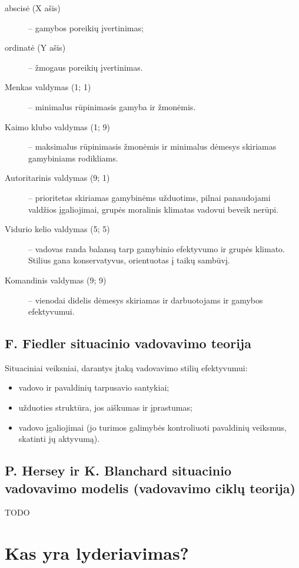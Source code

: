 \begin{description}
  \item[abscisė (X ašis)] – gamybos poreikių įvertinimas;
  \item[ordinatė (Y ašis)] – žmogaus poreikių įvertinimas.
\end{description}

\begin{description}
  \item[Menkas valdymas (1; 1)] – minimalus rūpinimasis gamyba ir žmonėmis.
  \item[Kaimo klubo valdymas (1; 9)] – maksimalus rūpinimasis žmonėmis
    ir minimalus dėmesys skiriamas gamybiniams rodikliams.
  \item[Autoritarinis valdymas (9; 1)] – prioritetas skiriamas gamybinėms
    užduotims, pilnai panaudojami valdžios įgaliojimai, grupės moralinis
    klimatas vadovui beveik nerūpi.
  \item[Vidurio kelio valdymas (5; 5)] – vadovas randa balansą tarp
    gamybinio efektyvumo ir grupės klimato. Stilius gana konservatyvus,
    orientuotas į taikų sambūvį.
  \item[Komandinis valdymas (9; 9)] – vienodai didelis dėmesys skiriamas
    ir darbuotojams ir gamybos efektyvumui.
\end{description}

\subsection{F. Fiedler situacinio vadovavimo teorija}

Situaciniai veiksniai, darantys įtaką vadovavimo stilių efektyvumui:
\begin{itemize}
  \item vadovo ir pavaldinių tarpusavio santykiai;
  \item užduoties struktūra, jos aiškumas ir įprastumas;
  \item vadovo įgaliojimai (jo turimos galimybės kontroliuoti pavaldinių
    veiksmus, skatinti jų aktyvumą).
\end{itemize}

\subsection{P. Hersey ir K. Blanchard situacinio vadovavimo modelis
(vadovavimo ciklų teorija)}

TODO

\section{Kas yra lyderiavimas?}

